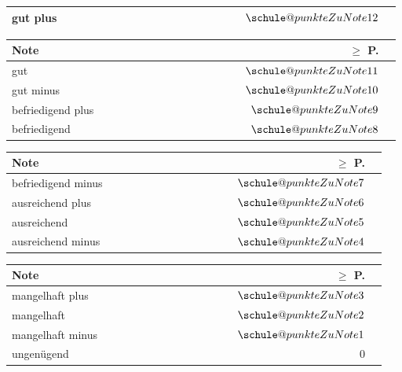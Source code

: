 {{{\begin{tabular}{|p{0.6\linewidth}|r|r|}
                \rowcolor{black!10}
                gut plus  & $\schule@punkteZuNote{12}$\\\hline
            \end{tabular}
        }
        \parbox{.24\linewidth}{
            \tiny
            \begin{tabular}{|p{0.6\linewidth}|r|r|}\hline
                \rowcolor{black!20}\textbf{Note}  &
                \textbf{$\ge$ P.}
                \\\hline
                gut & $\schule@punkteZuNote{11}$\\\hline
                \rowcolor{black!10}
                gut minus  & $\schule@punkteZuNote{10}$ \\\hline
                befriedigend plus & $\schule@punkteZuNote{9}$\\\hline
                \rowcolor{black!10}
                befriedigend  & $\schule@punkteZuNote{8}$\\\hline
            \end{tabular}
        }
        \parbox{.24\linewidth}{
            \tiny
            \begin{tabular}{|p{0.6\linewidth}|r|r|}\hline
                \rowcolor{black!20}\textbf{Note}  &
                \textbf{$\ge$ P.}
                \\\hline
                befriedigend minus  & $\schule@punkteZuNote{7}$\\\hline
                \rowcolor{black!10}
                ausreichend plus  & $\schule@punkteZuNote{6}$\\\hline
                ausreichend & $\schule@punkteZuNote{5}$\\\hline
                \rowcolor{black!10}
                ausreichend minus & $\schule@punkteZuNote{4}$\\\hline
            \end{tabular}
        }
        \parbox{.24\linewidth}{
            \tiny
            \begin{tabular}{|p{0.6\linewidth}|r|r|}\hline
                \rowcolor{black!20}\textbf{Note}  &
                \textbf{$\ge$ P.}
                \\\hline
                mangelhaft plus & $\schule@punkteZuNote{3}$\\\hline
                \rowcolor{black!10}
                mangelhaft  & $\schule@punkteZuNote{2}$\\\hline
                mangelhaft minus & $\schule@punkteZuNote{1}$\\\hline
                \rowcolor{black!10}
                ungenügend & $0$ \\\hline
            \end{tabular}
        }
    }
}
